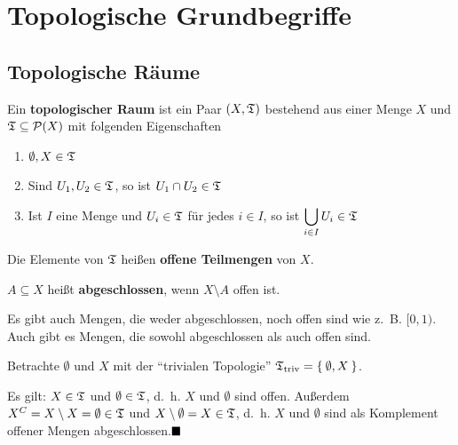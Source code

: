 \chapter{Topologische Grundbegriffe}
\section{Topologische Räume}
\begin{definition}   
    Ein \textbf{topologischer Raum} ist ein Paar $(X, \mathfrak{T})$ bestehend
    aus einer Menge $X$ und $\mathfrak{T} \subseteq \mathcal{P}(X)$ mit
    folgenden Eigenschaften
    \begin{enumerate}[label=(\roman*)]
        \item $\emptyset, X \in \mathfrak{T}$
        \item Sind $U_1, U_2 \in \mathfrak{T}$, so ist $U_1 \cap U_2 \in \mathfrak{T}$
        \item Ist $I$ eine Menge und $U_i \in \mathfrak{T}$ für jedes $i \in I$,
              so ist $\displaystyle \bigcup_{i \in I} U_i \in \mathfrak{T}$
    \end{enumerate}
    Die Elemente von $\mathfrak{T}$ heißen \textbf{offene Teilmengen} von $X$. 

    $A \subseteq X$ heißt \textbf{abgeschlossen}, wenn $X \setminus A$ offen ist.

\end{definition}

Es gibt auch Mengen, die weder abgeschlossen, noch offen sind wie z.~B. $[0,1)$.
Auch gibt es Mengen, die sowohl abgeschlossen als auch offen sind.

\begin{bemerkung}
    Betrachte $\emptyset$ und $X$ mit der \enquote{trivialen Topologie}
     $\mathfrak{T}_{\textnormal{triv}} = \Set{\emptyset, X}$.

    Es gilt: $X \in \mathfrak{T}$ und $\emptyset \in \mathfrak{T}$, d.~h. $X$ und $\emptyset$
    sind offen. Außerdem $X^C = X \setminus X = \emptyset \in \mathfrak{T}$
    und $X \setminus \emptyset = X \in \mathfrak{T}$, d.~h. $X$ und $\emptyset$
    sind als Komplement offener Mengen abgeschlossen.$\qed$
\end{bemerkung}

